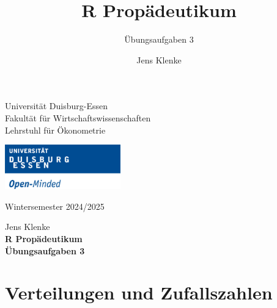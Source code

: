 \documentclass[12pt,a4paper]{article}
\title{R Propädeutikum}
\subtitle{Übungsaufgaben 3}
\author{Jens Klenke}
\date{}
\begin{document}





\restoregeometry



\begin{minipage}{0.6\textwidth}
Universität Duisburg-Essen\\
Fakultät für Wirtschaftswissenschaften\\
Lehrstuhl für Ökonometrie\\
\end{minipage}

	\begin{flushright}
	\vspace{-3cm}
	\includegraphics*[width=5cm]{includes/duelogo_en.png}\\
	\vspace{.125cm}
	\end{flushright}
\hspace{-0.005cm}Wintersemester 2024/2025

\vspace{0.05cm}

\begin{center}
	\vspace{.25cm}
	Jens Klenke \hspace{.5cm}  \\
	\vspace{.25cm}
	\textbf{\Large{R Propädeutikum}}\\
	\vspace{.25cm}
	\textbf{\large{Übungsaufgaben 3}}\\
	\vspace{.125cm}
\end{center}





\section{Verteilungen und
Zufallszahlen}\label{verteilungen-und-zufallszahlen}
\end{document}
